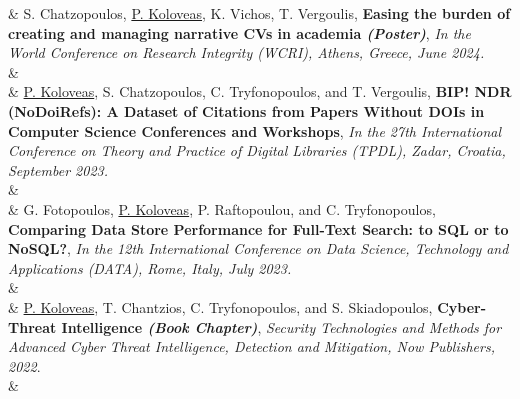 %
\nohyphens{\color{gray}{Publications}} 
& S. Chatzopoulos, \underline{P. Koloveas}, K. Vichos, T. Vergoulis, \textbf{Easing the burden of creating and managing narrative CVs in academia \textit{(Poster)}}, \textit{In the World Conference on Research Integrity (WCRI), Athens, Greece, June 2024.} \\
& \\ [-5pt]

& \underline{P. Koloveas}, S. Chatzopoulos, C. Tryfonopoulos, and T. Vergoulis, \textbf{BIP! NDR (NoDoiRefs): A Dataset of Citations from Papers Without DOIs in Computer Science Conferences and Workshops}, \textit{In the 27th International Conference on Theory and Practice of Digital Libraries (TPDL), Zadar, Croatia, September 2023.} \\
&  \\ [-5pt]


& G. Fotopoulos, \underline{P. Koloveas}, P. Raftopoulou, and C. Tryfonopoulos, \textbf{Comparing Data Store Performance for Full-Text Search: to SQL or to NoSQL?}, \textit{In the 12th International Conference on Data Science, Technology and Applications (DATA), Rome, Italy, July 2023.} \\
& \\[-5pt]


& \underline{P. Koloveas}, T. Chantzios, C. Tryfonopoulos, and S. Skiadopoulos, \textbf{Cyber-Threat Intelligence \textit{(Book Chapter)}}, \textit{Security Technologies and Methods for Advanced Cyber Threat Intelligence, Detection and Mitigation, Now Publishers, 2022}. \\
& \\ [-5pt]

